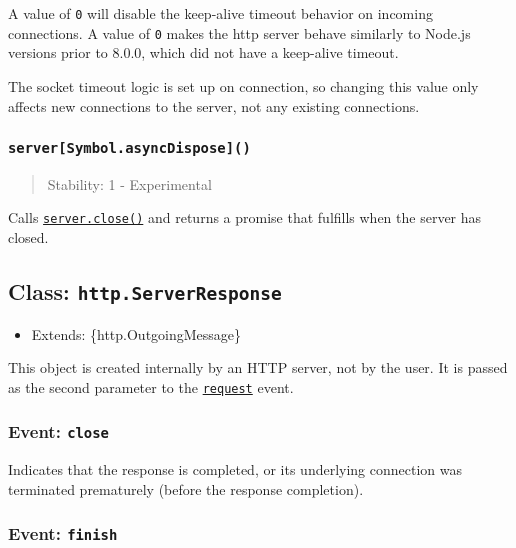 A value of \texttt{0} will disable the keep-alive timeout behavior on
incoming connections. A value of \texttt{0} makes the http server behave
similarly to Node.js versions prior to 8.0.0, which did not have a
keep-alive timeout.

The socket timeout logic is set up on connection, so changing this value
only affects new connections to the server, not any existing
connections.

\subsubsection{\texorpdfstring{\texttt{server{[}Symbol.asyncDispose{]}()}}{server{[}Symbol.asyncDispose{]}()}}\label{serversymbol.asyncdispose}

\begin{quote}
Stability: 1 - Experimental
\end{quote}

Calls \hyperref[serverclosecallback]{\texttt{server.close()}} and
returns a promise that fulfills when the server has closed.

\subsection{\texorpdfstring{Class:
\texttt{http.ServerResponse}}{Class: http.ServerResponse}}\label{class-http.serverresponse}

\begin{itemize}
\tightlist
\item
  Extends: \{http.OutgoingMessage\}
\end{itemize}

This object is created internally by an HTTP server, not by the user. It
is passed as the second parameter to the
\hyperref[event-request]{\texttt{\textquotesingle{}request\textquotesingle{}}}
event.

\subsubsection{\texorpdfstring{Event:
\texttt{\textquotesingle{}close\textquotesingle{}}}{Event: \textquotesingle close\textquotesingle{}}}\label{event-close-2}

Indicates that the response is completed, or its underlying connection
was terminated prematurely (before the response completion).

\subsubsection{\texorpdfstring{Event:
\texttt{\textquotesingle{}finish\textquotesingle{}}}{Event: \textquotesingle finish\textquotesingle{}}}\label{event-finish-1}

